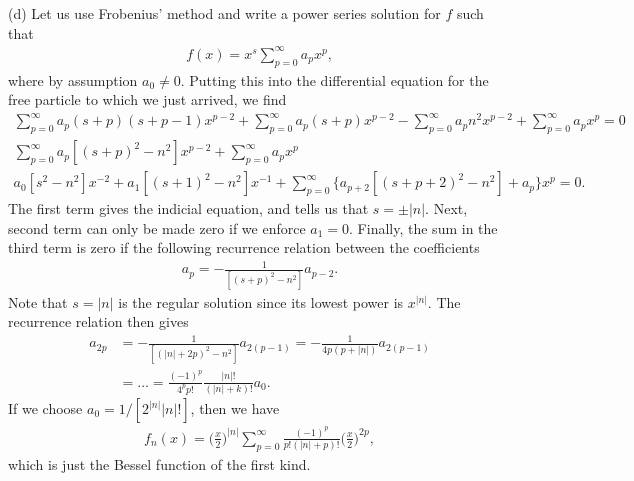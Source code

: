 {(d) Let us use Frobenius' method and write a power series solution for $f$ such that
\begin{eqnarray}
    f(x) = x^{s} \sum_{p=0}^{\infty} a_{p} x^{p}
,\end{eqnarray}
where by assumption $a_0 \ne 0$.
Putting this into the differential equation for the free particle to which we just arrived, we find
\begin{gather}
    \sum_{p=0}^{\infty} a_{p} (s + p) (s + p - 1) x^{p-2} + \sum_{p=0}^{\infty} a_{p} (s + p) x^{p-2} - \sum_{p=0}^{\infty} a_{p} n^2 x^{p-2} + \sum_{p=0}^{\infty} a_{p} x^{p} = 0 \nonumber \\
    \sum_{p=0}^{\infty} a_{p} [ (s + p)^2 - n^2 ] x^{p-2} + \sum_{p=0}^{\infty} a_{p} x^{p} \nonumber \\
    a_{0} [s^2 - n^2] x^{-2} + a_1 [ (s+1)^2 - n^2 ] x^{-1} + \sum_{p=0}^{\infty} \Big\{ a_{p+2} [ (s + p + 2)^2 - n^2 ] + a_{p} \Big\} x^{p} = 0
.\end{gather}
The first term gives the indicial equation, and tells us that $s = \pm |n|$.
Next, second term can only be made zero if we enforce $a_1 = 0$.
Finally, the sum in the third term is zero if the following recurrence relation between the coefficients
\begin{eqnarray}
    a_{p} = - \frac{1}{[ (s+p)^2 - n^2 ]} a_{p-2}
.\end{eqnarray}
Note that $s = |n|$ is the regular solution since its lowest power is $x^{|n|}$.
The recurrence relation then gives
\begin{align}
    a_{2p} &= -\frac{1}{[ ( |n| + 2p)^2 - n^2 ]} a_{2(p-1)} = -\frac{1}{4p(p + |n|)} a_{2(p-1)} \nonumber \\
           &= \ldots = \frac{(-1)^{p}}{4^{p} p!} \frac{|n|!}{(|n|+k)!} a_0
.\end{align}
If we choose $a_0 = 1/[ 2^{|n|} |n|! ]$, then we have
\begin{eqnarray}
    f_{n}(x) = \Big( \frac{x}{2} \Big)^{|n|} \sum_{p=0}^{\infty} \frac{(-1)^{p}}{p! ( |n| + p )!} \Big( \frac{x}{2} \Big)^{2p}
,\end{eqnarray}
which is just the Bessel function of the first kind.

}



